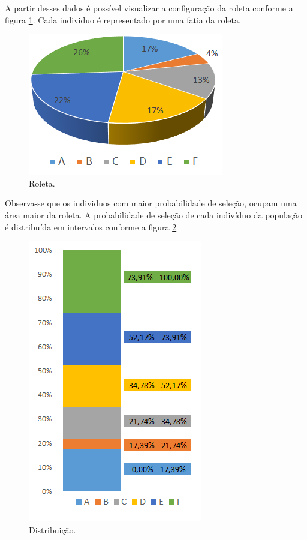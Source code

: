 \documentclass[twoside]{article}
\begin{document}
\begin{multicols}{2}
A partir desses dados é possível visualizar a configuração da roleta conforme a figura \ref{fig:roleta}. Cada individuo é representado por uma fatia da roleta.

\begin{figure}[H]
\label{fig:roleta}
  \caption{Roleta.}
  \centering
    \includegraphics[scale = 0.7]{roleta.png}
\end{figure}

Observa-se que os individuos com maior probabilidade de seleção, ocupam uma área maior da roleta. A probabilidade de seleção de cada indivíduo da população é distribuída em intervalos conforme a figura \ref{fig:ditrib}

\begin{figure}[H]
\label{fig:ditrib}
  \caption{Distribuição.}
  \centering
    \includegraphics[scale = 0.8]{roleta_dist2.png}
\end{figure}


\end{multicols}
\end{document}
